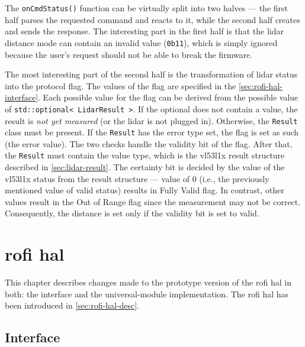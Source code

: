 \documentclass[
  digital,     %
  oneside,     %
  nosansbold,  %
  nocolorbold, %
  nolof,         %
  nolot,         %
]{fithesis4}
\newcommand{\TODO}[1]{#1} %
\newcommand{\TODOLIST}[1]{}
\begin{document}
The \lstinline|onCmdStatus()| function can be virtually split into two halves --- the first half
parses the requested command and reacts to it, while the second half creates and sends the response.
The interesting part in the first half is that the \acrshort{lidar} distance mode can contain an
invalid value (\lstinline|0b11|), which is simply ignored because the user's request should not be
able to break the firmware.

The most interesting part of the second half is the transformation of \acrshort{lidar} status into
the protocol flag. The values of the flag are specified in the \autoref{sec:rofi-hal-interface}.
Each possible value for the flag can be derived from the possible value of \lstinline|std::optional<
LidarResult >|. If the optional does not contain a value,  the result is \emph{not yet measured} (or
the \acrshort{lidar} is not plugged in). Otherwise, the \lstinline|Result| class must be present. If
the \lstinline|Result| has the error type set, the flag is set as such (the error value). The two
checks handle the validity bit of the flag. After that, the \lstinline|Result| must contain the
value type, which is the \gls{vl53l1x} result structure described in \autoref{sec:lidar-result}. The
certainty bit is decided by the value of the \gls{vl53l1x} status from the result structure ---
value of $0$ (i.e., the previously mentioned value of valid status) results in Fully Valid flag. In
contrast, other values result in the Out of Range flag since the measurement may not be correct.
Consequently, the distance is set only if the validity bit is set to valid.

\chapter[ RoFI Hardware Abstraction Layer ]{ \acrshort{rofi} \acrlong{hal} } \label{ch:rofi-hal}

This chapter describes changes made to the prototype version of the \acrshort{rofi} \acrshort{hal}
in both: the interface and the \gls{universal-module} implementation. The \acrshort{rofi}
\acrshort{hal} has been introduced in \autoref{sec:rofi-hal-desc}.

\section{Interface} \label{sec:rofi-hal-interface}

\TODOLIST{
\begin{itemize}
    \item Current interface components - RoFI, joint, connector
    \item \textbf{Proxy} 
    \item Changes done --- Added distance and status
\end{itemize}
}
\end{document}
